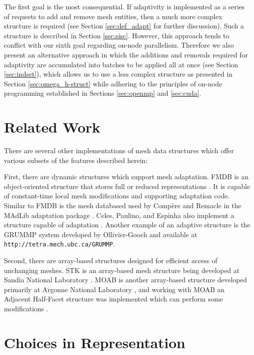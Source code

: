 The first goal is the most consequential.
If adaptivity is implemented as a series of requests to
add and remove mesh entities, then a much more complex structure is required
(see Section \ref{sec:def_adapt} for further discussion).
Such a structure is described in Section \ref{sec:sisc}.
However, this approach tends to conflict with our sixth goal regarding
on-node parallelism.
Therefore we also present an alternative
approach in which the additions and removals required for adaptivity
are accumulated into batches to be applied all at once
(see Section \ref{sec:indset}), which allows us to use a less complex structure
as presented in Section \ref{sec:omega_h-struct} while adhering to the
principles of on-node programming established in Sections
\ref{sec:openmp} and \ref{sec:cuda}.

\section{Related Work}

There are several other implementations of mesh data structures
which offer various subsets of the features described herein:

First, there are dynamic structures which support mesh adaptation.
FMDB is an object-oriented structure that
stores full or reduced representations \cite{seol2005fmdb,seol2006efficient}.
It is capable of constant-time local
mesh modifications and supporting adaptation code.
Similar to FMDB is the mesh databased used by Comp\`{e}re and Remacle
in the MAdLib adaptation package \cite{compere2010mesh}.
Celes, Paulino, and Espinha also implement a structure capable of
adaptation \cite{celes2005compact}.
Another example of an adaptive structure
is the GRUMMP system developed by Ollivier-Gooch
and available at \texttt{http://tetra.mech.ubc.ca/GRUMMP}.

Second, there are array-based structures designed for
efficient access of unchanging meshes.
STK is an array-based mesh structure being developed at
Sandia National Laboratory \cite{edwards2010sierra}.
MOAB is another array-based structure developed primarily
at Argonne National Laboratory \cite{tautges_moab:_2004},
and working with MOAB an Adjacent Half-Facet structure
was implemented which can perform some modifications \cite{dyedov2014ahf}.

\section{Choices in Representation}

